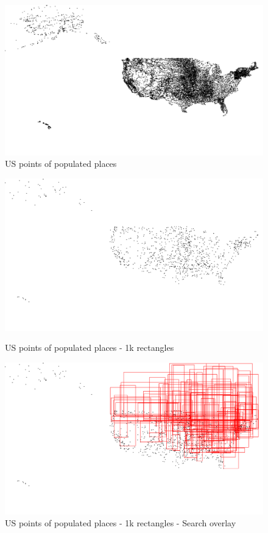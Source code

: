 \begin{figure}
\centering
\begin{minipage}{\textwidth}
\centering
\includegraphics[width=.7\textwidth]{fig/usppp.pdf}
\caption{US points of populated places}
\label{fig:usdata}
\end{minipage}
\end{figure}
\begin{figure}
\centering
\begin{minipage}{0.49\textwidth}
\centering
\includegraphics[width=\textwidth]{fig/uspp1k.pdf}
\caption{US points of populated places - 1k rectangles}
\label{fig:usdata1k}
\end{minipage}
\begin{minipage}{0.49\textwidth}
\centering
\includegraphics[width=\textwidth]{fig/uspp1kSearches.pdf}
\caption{US points of populated places - 1k rectangles - Search overlay}
\label{fig:usdataSearch}
\end{minipage}
\end{figure}


